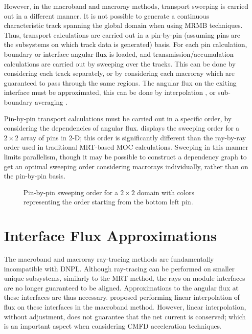 {{        However, in the macroband and macroray methods, transport sweeping is carried out in a different manner.
        It is not possible to generate a continuous characteristic track spanning the global domain when using \ac{MRMB} techniques.
        Thus, transport calculations are carried out in a pin-by-pin (assuming pins are the subsystems on which track data is generated) basis.
        For each pin calculation, boundary or interface angular flux is loaded, and transmission/accumulation calculations are carried out by sweeping over the tracks.
        This can be done by considering each track separately, or by considering each macroray which are guaranteed to pass through the same regions.
        The angular flux on the exiting interface must be approximated, this can be done by interpolation \cite{Yamamoto2005}, or sub-boundary averaging \cite{Liu2014}.

        Pin-by-pin transport calculations must be carried out in a specific order, by considering the dependencies of angular flux.
         displays the sweeping order for a $2\times2$ array of pins in 2-D; this order is significantly different than the ray-by-ray order used in traditional \ac{MRT}-based \ac{MOC} calculations.
        Sweeping in this manner limits parallelism, though it may be possible to construct a dependency graph to get an optimal sweeping order considering macrorays individually, rather than on the pin-by-pin basis.

        \begin{figure}[h]
            \centering
            \def\svgwidth{0.65\linewidth}
            
            \caption{Pin-by-pin sweeping order for a $2\times2$ domain with colors representing the order starting from the bottom left pin.}
            \label{fig:RT:Macroband Sweep Order}
        \end{figure}
    }
    \section{Interface Flux Approximations}{\label{sec:Interface Flux Approximations}
      The macroband and macroray ray-tracing methods are fundamentally incompatible with \acf{DNPL}.
      Although ray-tracing can be performed on smaller unique subsystems, similarly to the \ac{MRT} method, the rays on module interfaces are no longer guaranteed to be aligned.
      Approximations to the angular flux at these interfaces are thus necessary.
      \citet{Yamamoto2005} proposed performing linear interpolation of flux on these interfaces in the macroband method.
      However, linear interpolation, without adjustment, does not guarantee that the net current is conserved; which is an important aspect when considering \ac{CMFD} acceleration techniques.

}}
